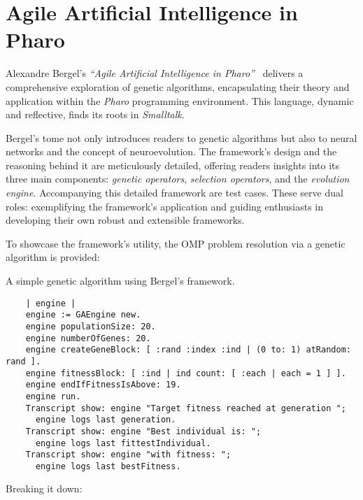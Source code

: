 \section{Agile Artificial Intelligence in Pharo}
\label{sec:sota:pharo}
  Alexandre Bergel's \emph{\enquote{Agile Artificial Intelligence in 
  Pharo}}~\autocite{bergelAgileArtificialIntelligence2020} delivers a 
  comprehensive exploration of genetic algorithms, encapsulating their theory 
  and application within the \textit{Pharo} programming environment.
  This language, dynamic and reflective, finds its roots in \textit{Smalltalk}.

  Bergel's tome not only introduces readers to genetic algorithms but also to 
  neural networks and the concept of neuroevolution.
  The framework's design and the reasoning behind it are meticulously detailed, 
  offering readers insights into its three main components: \emph{genetic 
  operators}, \emph{selection operators}, and the \emph{evolution engine}.
  Accompanying this detailed framework are test cases.
  These serve dual roles: exemplifying the framework's application and guiding 
  enthusiasts in developing their own robust and extensible frameworks.

  To showcase the framework's utility, the OMP problem resolution via a genetic 
  algorithm is provided:

  \begin{listing}[H]
    \caption{A simple genetic algorithm using Bergel's framework.}
    \label{src:sota:pharo:example}
  \end{listing}
  \vspace{-2em}
  \begin{verbatim}
    | engine |
    engine := GAEngine new.
    engine populationSize: 20.
    engine numberOfGenes: 20.
    engine createGeneBlock: [ :rand :index :ind | (0 to: 1) atRandom: rand ].
    engine fitnessBlock: [ :ind | ind count: [ :each | each = 1 ] ].
    engine endIfFitnessIsAbove: 19.
    engine run.
    Transcript show: engine "Target fitness reached at generation "; 
      engine logs last generation.
    Transcript show: engine "Best individual is: "; 
      engine logs last fittestIndividual.
    Transcript show: engine "with fitness: ";
      engine logs last bestFitness.
  \end{verbatim}

  Breaking it down:

